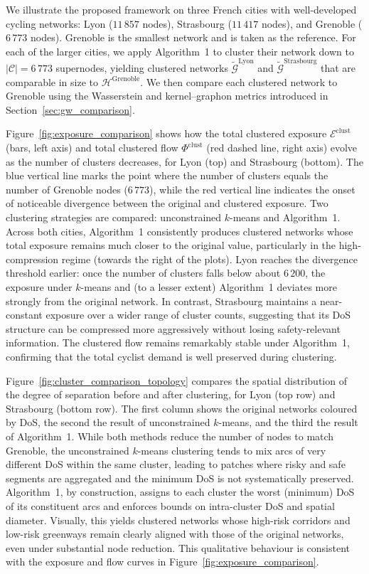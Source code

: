 \documentclass[lettersize,journal]{IEEEtran}
\begin{document}
We illustrate the proposed framework on three French cities with well-developed cycling networks:
Lyon ($11\,857$ nodes), Strasbourg ($11\,417$ nodes), and Grenoble ($6\,773$ nodes).  
Grenoble is the smallest network and is taken as the reference.  
For each of the larger cities, we apply Algorithm~1 to cluster their network down to $|\mathcal{C}| = 6\,773$ supernodes, yielding clustered networks $\tilde{\mathcal{G}}^{\mathrm{Lyon}}$ and $\tilde{\mathcal{G}}^{\mathrm{Strasbourg}}$ that are comparable in size to $\mathcal{H}^{\mathrm{Grenoble}}$.
We then compare each clustered network to Grenoble using the Wasserstein and kernel–graphon metrics introduced in Section~\ref{sec:gw_comparison}.


Figure~\ref{fig:exposure_comparison} shows how the total clustered exposure $\mathcal{E}^{\mathrm{clust}}$ (bars, left axis) and total clustered flow $\Phi^{\mathrm{clust}}$ (red dashed line, right axis) evolve as the number of clusters decreases, for Lyon (top) and Strasbourg (bottom).  
The blue vertical line marks the point where the number of clusters equals the number of Grenoble nodes ($6\,773$), while the red vertical line indicates the onset of noticeable divergence between the original and clustered exposure. Two clustering strategies are compared: unconstrained $k$-means and Algorithm~1.  
Across both cities, Algorithm~1 consistently produces clustered networks whose total exposure remains much closer to the original value, particularly in the high-compression regime (towards the right of the plots).  
Lyon reaches the divergence threshold earlier: once the number of clusters falls below about $6\,200$, the exposure under $k$-means and (to a lesser extent) Algorithm~1 deviates more strongly from the original network.  
In contrast, Strasbourg maintains a near-constant exposure over a wider range of cluster counts, suggesting that its DoS structure can be compressed more aggressively without losing safety-relevant information.  
The clustered flow remains remarkably stable under Algorithm~1, confirming that the total cyclist demand is well preserved during clustering.

Figure~\ref{fig:cluster_comparison_topology} compares the spatial distribution of the degree of separation before and after clustering, for Lyon (top row) and Strasbourg (bottom row).  
The first column shows the original networks coloured by DoS, the second the result of unconstrained $k$-means, and the third the result of Algorithm~1. While both methods reduce the number of nodes to match Grenoble, the unconstrained $k$-means clustering tends to mix arcs of very different DoS within the same cluster, leading to patches where risky and safe segments are aggregated and the minimum DoS is not systematically preserved. Algorithm~1, by construction, assigns to each cluster the worst (minimum) DoS of its constituent arcs and enforces bounds on intra-cluster DoS and spatial diameter. Visually, this yields clustered networks whose high-risk corridors and low-risk greenways remain clearly aligned with those of the original networks, even under substantial node reduction. This qualitative behaviour is consistent with the exposure and flow curves in Figure~\ref{fig:exposure_comparison}.
\end{document}

